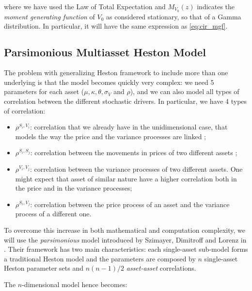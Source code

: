where we have used the Law of Total Expectation and $M_{V_0}(z)$ indicates the \textit{moment generating function} of $V_0$ as considered stationary, so that of a Gamma distribution. In particular, it will have the same expression as \eqref{eq:cir_mgf}.



\subsection{Parsimonious Multiasset Heston Model}
The problem with generalizing Heston framework to include more than one underlying is that the model becomes quickly very complex: we need 5 parameters for each asset ($\mu, \kappa,\theta, \sigma_V$ and $ \rho$), and we can also model all types of correlation between the different stochastic drivers. In particular, we have 4 types of correlation: 
\begin{itemize}
	\item $ \rho^{S_i , V_i}$:  correlation that we already have in the unidimensional case, that models the way the price and the variance processes are linked ;
	\item $ \rho^{S_i , S_j}$: correlation between the movements in prices of two different assets ;
	\item $\rho^{V_i , V_j} $: correlation between the variance processes of two different assets. One might expect that asset of similar nature have a higher correlation both in the price and in the variance processes;
	\item $\rho^{S_i , V_j} $: correlation between the price process of an asset and the variance process of a different one.
\end{itemize}

To overcome this increase in both mathematical and computation complexity, we will use the \textit{parsimonious} model introduced by Szimayer, Dimitroff and Lorenz in \cite{PARSIMONIOUS2011}. Their framework has two main characteristics: each single-asset sub-model forms a traditional Heston model and the parameters are  composed by $n$ single-asset Heston parameter sets and $n (n-1)/2$  \textit{asset-asset} correlations.

The $n$-dimensional model  hence becomes:


